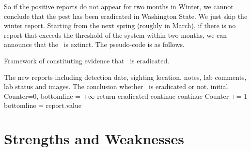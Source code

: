 \documentclass{mcmthesis}
\begin{document}
So if the positive reports do not appear for two months in Winter, we cannot conclude that the pest has been eradicated in Washington State. We just skip the winter report. Starting from the next spring (roughly in March), if there is no report that exceeds the threshold of the system within two months, we can announce that the \VM\ is extinct. The pseudo-code is as follows.
\begin{breakablealgorithm}
  \caption{ Framework of constituting evidence that \VM\ is eradicated.}
  \label{alg:Framwork}
  \begin{algorithmic}[1]
    \Require
        The new reports including detection date, sighting location, notes, lab comments, lab status and images.
    \Ensure
        The conclusion whether \VM\ is eradicated or not.
    \State initial Counter=0, bottomline = $+\infty$
    \State return eradicated
    \EndIf
    \State continue
    \Else
    \State continue
    \Else
    \State Counter += 1
    bottomline = report.value
    \EndIf
    \EndIf
    \EndIf
  \end{algorithmic}
\end{breakablealgorithm}

\section{Strengths and Weaknesses}
\end{document}
